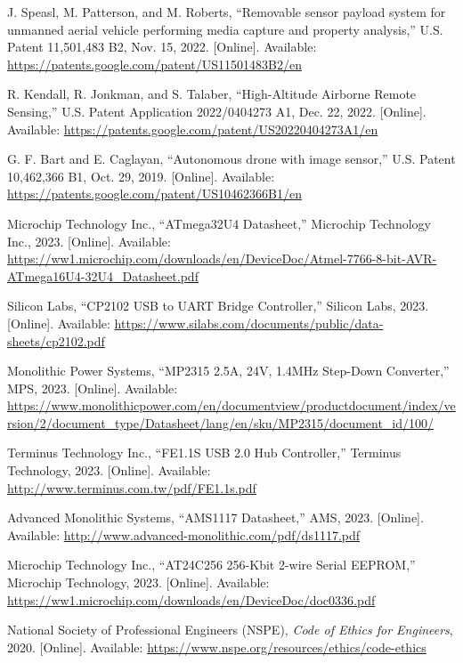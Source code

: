 \documentclass[12pt]{article}
\begin{document}
\begin{thebibliography}{99}
J. Speasl, M. Patterson, and M. Roberts, ``Removable sensor payload system for unmanned aerial vehicle performing media capture and property analysis,'' U.S. Patent 11,501,483 B2, Nov. 15, 2022. [Online]. Available: \url{https://patents.google.com/patent/US11501483B2/en}

R. Kendall, R. Jonkman, and S. Talaber, ``High-Altitude Airborne Remote Sensing,'' U.S. Patent Application 2022/0404273 A1, Dec. 22, 2022. [Online]. Available: \url{https://patents.google.com/patent/US20220404273A1/en}

G. F. Bart and E. Caglayan, ``Autonomous drone with image sensor,'' U.S. Patent 10,462,366 B1, Oct. 29, 2019. [Online]. Available: \url{https://patents.google.com/patent/US10462366B1/en}

Microchip Technology Inc., ``ATmega32U4 Datasheet,'' Microchip Technology Inc., 2023. [Online]. Available: \url{https://ww1.microchip.com/downloads/en/DeviceDoc/Atmel-7766-8-bit-AVR-ATmega16U4-32U4_Datasheet.pdf}

Silicon Labs, ``CP2102 USB to UART Bridge Controller,'' Silicon Labs, 2023. [Online]. Available: \url{https://www.silabs.com/documents/public/data-sheets/cp2102.pdf}

Monolithic Power Systems, ``MP2315 2.5A, 24V, 1.4MHz Step-Down Converter,'' MPS, 2023. [Online]. Available: \url{https://www.monolithicpower.com/en/documentview/productdocument/index/version/2/document_type/Datasheet/lang/en/sku/MP2315/document_id/100/}

Terminus Technology Inc., ``FE1.1S USB 2.0 Hub Controller,'' Terminus Technology, 2023. [Online]. Available: \url{http://www.terminus.com.tw/pdf/FE1.1s.pdf}

Advanced Monolithic Systems, ``AMS1117 Datasheet,'' AMS, 2023. [Online]. Available: \url{http://www.advanced-monolithic.com/pdf/ds1117.pdf}

Microchip Technology Inc., ``AT24C256 256-Kbit 2-wire Serial EEPROM,'' Microchip Technology, 2023. [Online]. Available: \url{https://ww1.microchip.com/downloads/en/DeviceDoc/doc0336.pdf}

National Society of Professional Engineers (NSPE), \emph{Code of Ethics for Engineers}, 2020. [Online]. Available: \url{https://www.nspe.org/resources/ethics/code-ethics}


\end{thebibliography}
\end{document}
